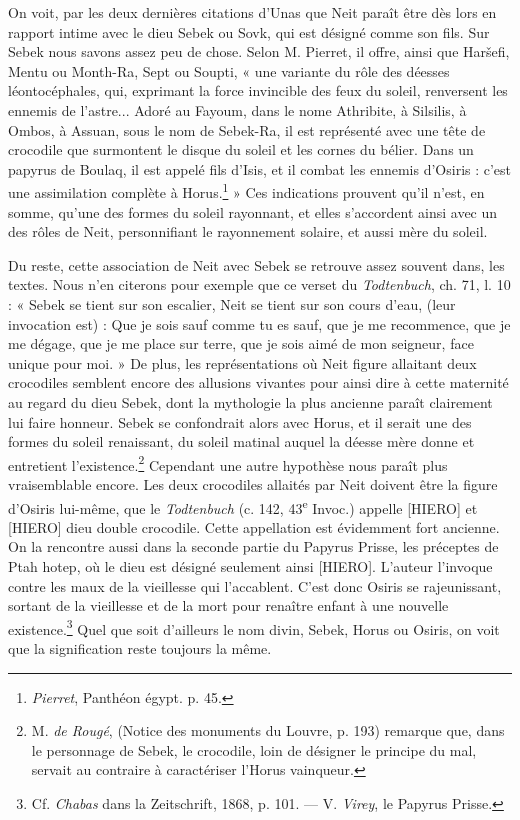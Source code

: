 \documentclass[a4paper, 11pt, oneside]{article}
\begin{document}
On voit, par les deux dernières citations d'Unas que Neit paraît être dès lors en rapport intime avec le dieu Sebek ou Sovk, qui est désigné comme son fils. Sur Sebek nous savons assez peu de chose. Selon M. Pierret, il offre, ainsi que Haršefi, Mentu ou Month-Ra, Sept ou Soupti, « une variante du rôle des déesses léontocéphales, qui, exprimant la force invincible des feux du soleil, renversent les ennemis de l'astre... Adoré au Fayoum, dans le nome Athribite, à Silsilis, à Ombos, à Assuan, sous le nom de Sebek-Ra, il est représenté avec une tête de crocodile que surmontent le disque du soleil et les cornes du bélier. Dans un papyrus de Boulaq, il est appelé fils d'Isis, et il combat les ennemis d'Osiris : c'est une assimilation complète à Horus.\footnote{\emph{Pierret}, Panthéon égypt. p. 45.} » Ces indications prouvent qu'il n'est, en somme, qu'une des formes du soleil rayonnant, et elles s'accordent ainsi avec un des rôles de Neit, personnifiant le rayonnement solaire, et aussi mère du soleil.

Du reste, cette association de Neit avec Sebek se retrouve assez souvent dans, les textes. Nous n'en citerons pour exemple que ce verset du \emph{Todtenbuch}, ch. 71, l. 10 : « Sebek se tient sur son escalier, Neit se tient sur son cours d'eau, (leur invocation est) : Que je sois sauf comme tu es sauf, que je me recommence, que je me dégage, que je me place sur terre, que je sois aimé de mon seigneur, face unique pour moi. » De plus, les représentations où Neit figure allaitant deux crocodiles semblent encore des allusions vivantes pour ainsi dire à cette maternité au regard du dieu Sebek, dont la mythologie la plus ancienne paraît clairement lui faire honneur. Sebek se confondrait alors avec Horus, et il serait une des formes du soleil renaissant, du soleil matinal auquel la déesse mère donne et entretient l'existence.\footnote{M. \emph{de Rougé}, (Notice des monuments du Louvre, p. 193) remarque que, dans le personnage de Sebek, le crocodile, loin de désigner le principe du mal, servait au contraire à caractériser l'Horus vainqueur.} Cependant une autre hypothèse nous paraît plus vraisemblable encore. Les deux crocodiles allaités par Neit doivent être la figure d'Osiris lui-même, que le \emph{Todtenbuch} (c. 142, 43\textsuperscript{e} Invoc.) appelle [HIERO] et [HIERO] dieu double crocodile. Cette appellation est évidemment fort ancienne. On la rencontre aussi dans la seconde partie du Papyrus Prisse, les préceptes de Ptah hotep, où le dieu est désigné seulement ainsi [HIERO]. L'auteur l'invoque contre les maux de la vieillesse qui l'accablent. C'est donc Osiris se rajeunissant, sortant de la vieillesse et de la mort pour renaître enfant à une nouvelle existence.\footnote{Cf. \emph{Chabas} dans la Zeitschrift, 1868, p. 101. --- V. \emph{Virey}, le Papyrus Prisse.} Quel que soit d'ailleurs le nom divin, Sebek, Horus ou Osiris, on voit que la signification reste toujours la même.
\end{document}
